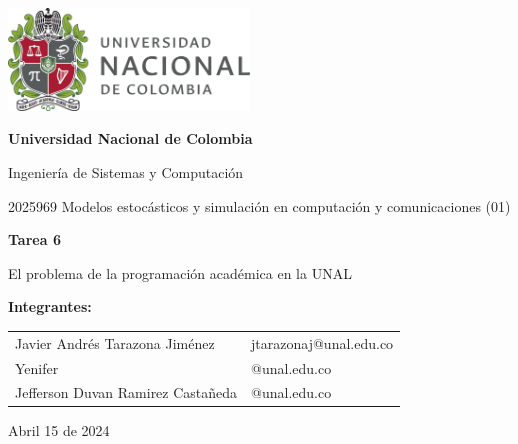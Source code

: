 \documentclass{article}
\begin{document}
\begin{titlepage}
    \centering
    \includegraphics[width=0.48\textwidth]{logo_universidad.png}
    \par\vspace{2cm}

    {\Large \textbf{Universidad Nacional de Colombia} \par}
    \vspace{0.5cm}
    {\large Ingeniería de Sistemas y Computación \par}
    {\large 2025969 Modelos estocásticos y simulación en computación y comunicaciones (01)\par}
    \vspace{3cm}

    {\large \textbf{Tarea 6} \par}
    {\large El problema de la programación académica en la UNAL \par}
    \vspace{3cm}

    {\large \textbf{Integrantes:} \par}
    \vspace{0.5cm}
    \begin{tabular}{ll}
    Javier Andrés Tarazona Jiménez & jtarazonaj@unal.edu.co \\
    Yenifer & @unal.edu.co \\
    Jefferson Duvan Ramirez Castañeda & @unal.edu.co \\
    \end{tabular}
    \par\vspace{3cm}

    {\large Abril 15 de 2024 \par}
\end{titlepage}

\tableofcontents %

\newpage %

\end{document}
